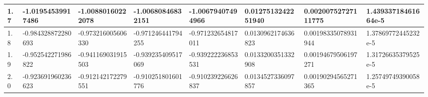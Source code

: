 \documentclass[12pt,b4paper,landscape]{memoir}
\begin{document}
\begin{table}[]
\begin{tabular}{|l|l|r|l|l|l|l|l|}
1.7                                                      & -1.01954539917486            & \multicolumn{1}{l|}{-1.00880160222078}  & -1.00680846832151       & -1.00679407494966  & 0.0127513242251940   & 0.00200752727111775           & 1.43933718461664e-5           \\ \hline
1.8                                                      & -0.984328872280693           & \multicolumn{1}{l|}{-0.973216005606330} & -0.971246441794255      & -0.971232654817011 & 0.0130962174636823   & 0.00198335078931944           & 1.37869772445232e-5           \\ \hline
1.9                                                      & -0.952542271986822           & \multicolumn{1}{l|}{-0.941169031915503} & -0.939235409517069      & -0.939222236853531 & 0.0133200351332908   & 0.00194679506197271           & 1.31726635379525e-5           \\ \hline
2.0                                                      & -0.923691960236623           & \multicolumn{1}{l|}{-0.912142172279551} & -0.910251801601776      & -0.910239226626837 & 0.0134527336097857   & 0.00190294565271365           & 1.25749749390058e-5           \\ \hline
\end{tabular}
\end{table}
\end{document}
